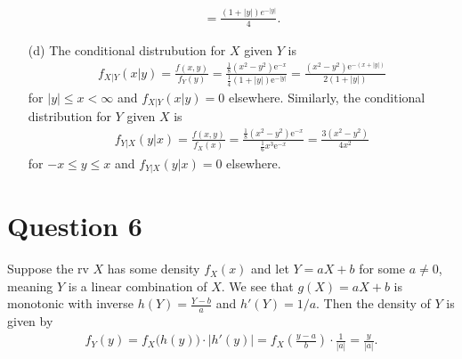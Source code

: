 \documentclass[10pt]{article}
\begin{document}
\begin{itemize}
\begin{align*}
        = \frac{(1 + |y|) e^{-|y|}}{4}.
    \end{align*}
    \item[(d)] The conditional distrubution for \(X\) given \(Y\) is 
    \begin{align*}
        f_{X|Y}(x|y) = \frac{f(x,y)}{f_Y(y)}
        = \frac{\frac{1}{8}(x^2 - y^2)\mathrm{e}^{-x}}{\frac{1}{4}(1 + |y|)\mathrm{e}^{-|y|}}
        = \frac{(x^2 - y^2)\mathrm{e}^{-(x + |y|)}}{2(1+|y|)}
    \end{align*}
    for \(|y| \le x < \infty\) and \(f_{X|Y}(x|y) = 0\) elsewhere. 
    Similarly, the conditional distribution for \(Y\) given \(X\) is 
    \begin{align*}
        f_{Y|X}(y|x) = \frac{f(x,y)}{f_X(x)}
        = \frac{\frac{1}{8}(x^2 - y^2)\mathrm{e}^{-x}}{\frac{1}{6}x^3 \mathrm{e}^{-x}}
        = \frac{3(x^2 - y^2)}{4x^2}
    \end{align*}
    for \(-x \le y \le x\) and \(f_{Y|X}(y|x) = 0\) elsewhere. 
\end{itemize}

\section{Question 6} \noindent
Suppose the rv \(X\) has some density \(f_X(x)\) and let \(Y = aX + b\) for some \(a \neq 0\), meaning \(Y\) is a linear combination of \(X\). 
We see that \(g(X) = aX + b\) is monotonic with inverse \(h(Y) = \frac{Y - b}{a}\) and \(h'(Y) = 1/a\). Then the density of \(Y\) is given by 
\begin{align*}
    f_Y(y) = f_X \big( h(y) \big) \cdot \big| h'(y) \big|
    = f_X\left( \frac{y - a}{b} \right) \cdot \frac{1}{|a|} = \frac{y}{|a|}.
\end{align*}
\end{document}
